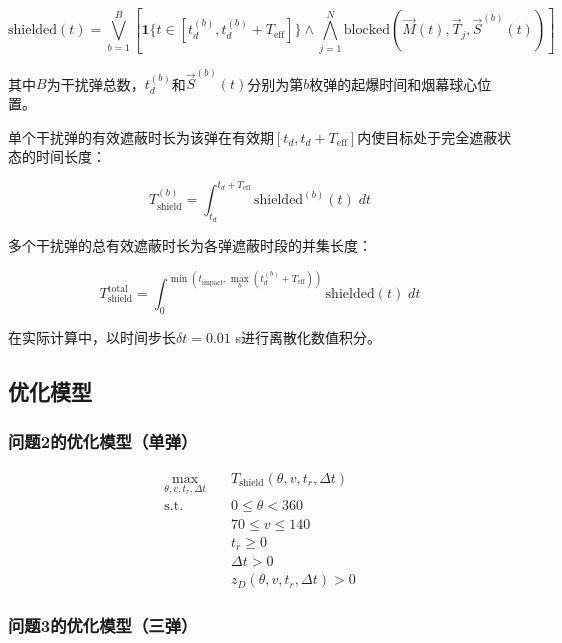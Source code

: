 \begin{equation}
    \text{shielded}(t) = \bigvee_{b=1}^{B} \left[\mathbf{1}\{t \in [t_d^{(b)}, t_d^{(b)} + T_{\text{eff}}]\} \wedge \bigwedge_{j=1}^{N} \text{blocked}(\vec{M}(t), \vec{T}_j, \vec{S}^{(b)}(t))\right]
\end{equation}

其中$B$为干扰弹总数，$t_d^{(b)}$和$\vec{S}^{(b)}(t)$分别为第$b$枚弹的起爆时间和烟幕球心位置。

单个干扰弹的有效遮蔽时长为该弹在有效期$[t_d, t_d+T_{\text{eff}}]$内使目标处于完全遮蔽状态的时间长度：

\begin{equation}
    T_{\text{shield}}^{(b)} = \int_{t_d}^{t_d+T_{\text{eff}}} \text{shielded}^{(b)}(t)\;dt
\end{equation}

多个干扰弹的总有效遮蔽时长为各弹遮蔽时段的并集长度：

\begin{equation}
    T_{\text{shield}}^{\text{total}} = \int_{0}^{\min(t_{\text{impact}}, \max_b(t_d^{(b)}+T_{\text{eff}}))} \text{shielded}(t)\;dt
\end{equation}

在实际计算中，以时间步长$\delta t = 0.01$ s进行离散化数值积分。

\subsection{优化模型}

\subsubsection{问题2的优化模型（单弹）}

\begin{align}
    \max_{\theta, v, t_r, \Delta t} \quad & T_{\text{shield}}(\theta, v, t_r, \Delta t) \\
    \text{s.t.} \quad & 0 \le \theta < 360 \\
    & 70 \le v \le 140 \\
    & t_r \ge 0 \\
    & \Delta t > 0 \\
    & z_D(\theta, v, t_r, \Delta t) > 0
\end{align}

\subsubsection{问题3的优化模型（三弹）}

